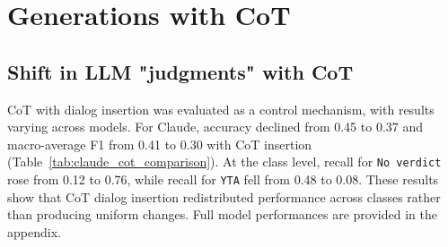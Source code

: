 \section{Generations with CoT}

\subsection{Shift in LLM "judgments" with CoT}\label{sec:posterchild2.2}

CoT with dialog insertion was evaluated as a control mechanism, with results varying across models. For Claude, accuracy declined from 0.45 to 0.37 and macro-average F1 from 0.41 to 0.30 with CoT insertion (Table~\ref{tab:claude_cot_comparison}). At the class level, recall for \texttt{No verdict} rose from 0.12 to 0.76, while recall for \texttt{YTA} fell from 0.48 to 0.08. These results show that CoT dialog insertion redistributed performance across classes rather than producing uniform changes. Full model performances are provided in the appendix.


\begin{table}[!h]
\centering
\renewcommand{\arraystretch}{1.2}
\caption{Claude performance on social judgments with and without CoT dialog insertion.}
\label{tab:claude_cot_comparison}
\end{table}

